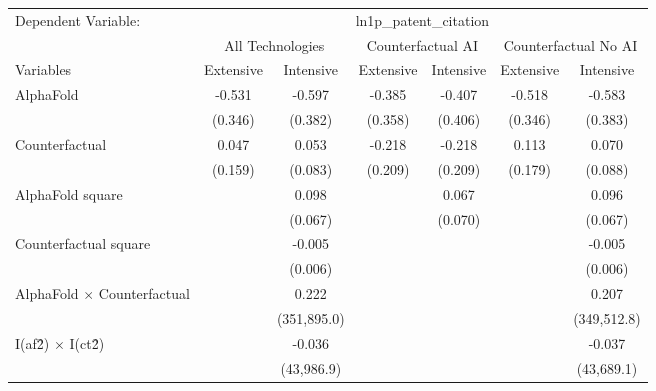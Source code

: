 \begingroup
\centering
\begin{tabular}{lcccccc}
   \tabularnewline \midrule \midrule
   Dependent Variable: & \multicolumn{6}{c}{ln1p\_patent\_citation}\\
 & \multicolumn{2}{c}{All Technologies} & \multicolumn{2}{c}{Counterfactual AI} & \multicolumn{2}{c}{Counterfactual No AI} \\
\cmidrule(lr){1-1}\cmidrule(lr){2-3} \cmidrule(lr){4-5} \cmidrule(lr){6-7}
Variables & \multicolumn{1}{c}{Extensive} & \multicolumn{1}{c}{Intensive} & \multicolumn{1}{c}{Extensive} & \multicolumn{1}{c}{Intensive} & \multicolumn{1}{c}{Extensive} & \multicolumn{1}{c}{Intensive} \\
\cmidrule(lr){1-1}\cmidrule(lr){2-2} \cmidrule(lr){3-3} \cmidrule(lr){4-4} \cmidrule(lr){5-5} \cmidrule(lr){6-6} \cmidrule(lr){7-7}
   AlphaFold                          & -0.531  & -0.597      & -0.385  & -0.407  & -0.518  & -0.583\\   
                                      & (0.346) & (0.382)     & (0.358) & (0.406) & (0.346) & (0.383)\\   
   Counterfactual                     & 0.047   & 0.053       & -0.218  & -0.218  & 0.113   & 0.070\\   
                                      & (0.159) & (0.083)     & (0.209) & (0.209) & (0.179) & (0.088)\\   
   AlphaFold square                   &         & 0.098       &         & 0.067   &         & 0.096\\   
                                      &         & (0.067)     &         & (0.070) &         & (0.067)\\   
   Counterfactual square              &         & -0.005      &         &         &         & -0.005\\   
                                      &         & (0.006)     &         &         &         & (0.006)\\   
   AlphaFold $\times$ Counterfactual  &         & 0.222       &         &         &         & 0.207\\   
                                      &         & (351,895.0) &         &         &         & (349,512.8)\\   
   I(af\^2) $\times$ I(ct\^2)         &         & -0.036      &         &         &         & -0.037\\   
                                      &         & (43,986.9)  &         &         &         & (43,689.1)\\   

\end{tabular}
